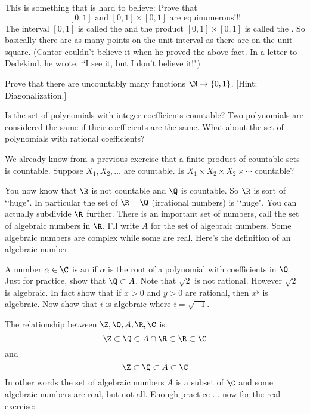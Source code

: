 \newpage
\begin{ex}
  This is something that is hard to believe:
  Prove that
  \[
  \text{$[0,1]$ and $[0,1] \times [0,1]$ are equinumerous!!!}
  \]
  The interval $[0,1]$ is called the 
  and the product $[0,1] \times [0,1]$ is called the .
  So basically there are as many points on the unit interval
  as there are on the unit square.
  (Cantor couldn't believe it when he proved the above fact.
  In a letter to Dedekind, he wrote,
  \lq\lq I see it, but I don’t believe it!")
\end{ex}

\newpage
\begin{ex}
Prove that there are uncountably many functions $\N \rightarrow
\{0,1\}$. [Hint: Diagonalization.]
\end{ex}


\newpage
\begin{ex}
  Is the set of polynomials with integer coefficients countable?
  Two polynomials are considered the same if their coefficients are the same.
  What about the set of polynomials with rational coefficients?
\end{ex}


\newpage
\begin{ex}
  We already know from a previous exercise that a finite
 product of countable sets is countable. Suppose $X_1, X_2, \ldots$
 are countable. Is $X_1 \times X_2 \times X_2 \times \cdots$
 countable?
\end{ex}

\newpage
You now know that $\R$ is not countable and $\Q$ is countable.
So $\R$ is sort of \lq\lq huge".
In particular the set of $\R - \Q$ (irrational numbers) is \lq\lq huge".
You can actually
subdivide $\R$ further.
There is an important set of numbers, call the
set of algebraic numbers in $\R$.
I'll write $A$ for the set of algebraic numbers.
Some algebraic numbers are complex while some are real.
Here's the definition of an algebraic number.

A number $\alpha \in \C$ is an 
if $\alpha$ is the root of a polynomial with coefficients in $\Q$.
Just for practice, show that $\Q \subset A$.
Note that $\sqrt{2}$ is not rational.
However $\sqrt{2}$ is algebraic.
In fact show that if $x > 0$ and $y > 0$ are rational, then
$x^y$ is algebraic.
Now show that $i$ is algebraic where $i = \sqrt{-1}$.

The relationship between $\Z, \Q, A, \R, \C$ is:
\[
\Z \subset \Q \subset A \cap \R \subset \R \subset \C
\]
and
\[
\Z \subset \Q \subset A \subset \C
\]
In other words the set of algebraic numbers $A$ is a subset of $\C$
and some algebraic numbers are real, but not all.
Enough practice ... now for the real exercise:


